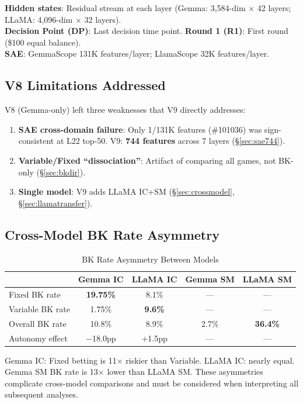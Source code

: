 \documentclass[11pt,a4paper]{article}
\begin{document}
\noindent\textbf{Hidden states}: Residual stream at each layer (Gemma: 3,584-dim $\times$ 42 layers; LLaMA: 4,096-dim $\times$ 32 layers).\\
\textbf{Decision Point (DP)}: Last decision time point. \textbf{Round 1 (R1)}: First round (\$100 equal balance).\\
\textbf{SAE}: GemmaScope 131K features/layer; LlamaScope 32K features/layer.

\subsection{V8 Limitations Addressed}

V8 (Gemma-only) left three weaknesses that V9 directly addresses:
\begin{enumerate}[nosep]
    \item \textbf{SAE cross-domain failure}: Only 1/131K features (\#101036) was sign-consistent at L22 top-50. V9: \textbf{744 features} across 7 layers (\S\ref{sec:sae744}).
    \item \textbf{Variable/Fixed ``dissociation''}: Artifact of comparing all games, not BK-only (\S\ref{sec:bkdir}).
    \item \textbf{Single model}: V9 adds LLaMA IC+SM (\S\ref{sec:crossmodel}, \S\ref{sec:llamatransfer}).
\end{enumerate}

\subsection{Cross-Model BK Rate Asymmetry}

\begin{table}[H]
\centering
\caption{BK Rate Asymmetry Between Models}\label{tab:t2}
\footnotesize
\begin{tabular}{lcccc}
\toprule
 & Gemma IC & LLaMA IC & Gemma SM & LLaMA SM \\
\midrule
Fixed BK rate    & \textbf{19.75\%} & 8.1\%  & --- & --- \\
Variable BK rate & 1.75\%  & \textbf{9.6\%}  & --- & --- \\
Overall BK rate  & 10.8\%  & 8.9\%  & 2.7\%  & \textbf{36.4\%} \\
Autonomy effect  & $-$18.0pp & $+$1.5pp & --- & --- \\
\bottomrule
\end{tabular}
\end{table}

\noindent Gemma IC: Fixed betting is 11$\times$ riskier than Variable. LLaMA IC: nearly equal. Gemma SM BK rate is 13$\times$ lower than LLaMA SM. These asymmetries complicate cross-model comparisons and must be considered when interpreting all subsequent analyses.
\end{document}
